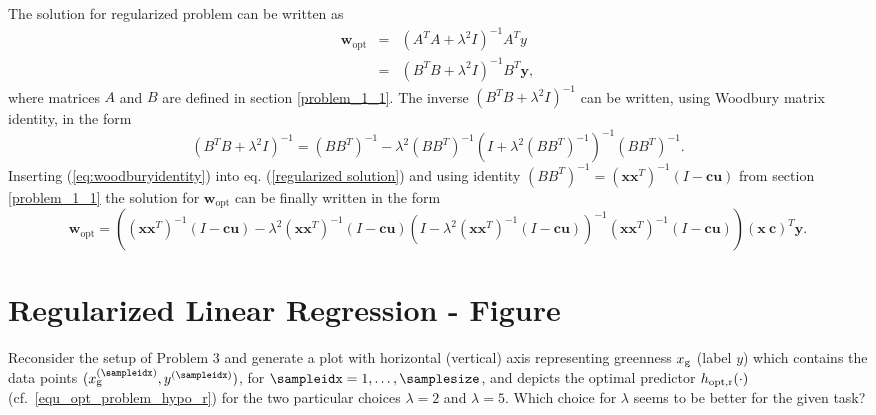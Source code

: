 \documentclass[article,11pt]{article}
\begin{document}
The solution for regularized problem can be written as
\begin{eqnarray}
  \mathbf{w}_\mathrm{opt}&=&(A^TA+\lambda^2I)^{-1}A^Ty\nonumber\\
  &=&(B^TB+\lambda^2I)^{-1}B^T\mathbf{y},
  \label{regularized solution}
\end{eqnarray}
where matrices $A$ and $B$ are defined in section \ref{problem_1_1}. The inverse
$(B^TB+\lambda^2I)^{-1}$ can be written, using Woodbury matrix identity, in the
form
\begin{equation}
  (B^TB+\lambda^2I)^{-1}=(BB^T)^{-1}-\lambda^2(BB^T)^{-1}(I + \lambda^2(BB^T)^{-1})^{-1}(BB^T)^{-1}.
  \label{eq:woodburyidentity}
\end{equation}
Inserting (\ref{eq:woodburyidentity}) into eq. (\ref{regularized solution}) and
using identity $(BB^T)^{-1}=(\mathbf{x}\mathbf{x}^T)^{-1}(I-\mathbf{c}\mathbf{u})$ from section \ref{problem_1_1} the solution for
$\mathbf{w}_\mathrm{opt}$ can be finally written in the form
\begin{equation}
  \mathbf{w}_\mathrm{opt}=\left((\mathbf{x}\mathbf{x}^T)^{-1}(I-\mathbf{c}\mathbf{u})-\lambda^2(\mathbf{x}\mathbf{x}^T)^{-1}(I-\mathbf{c}\mathbf{u})(I-\lambda^2(\mathbf{x}\mathbf{x}^T)^{-1}(I-\mathbf{c}\mathbf{u}))^{-1}(\mathbf{x}\mathbf{x}^T)^{-1}(I-\mathbf{c}\mathbf{u})\right)(\mathbf{x}\:\mathbf{c})^T\mathbf{y}.
\end{equation}
  
  

\newpage
\section{Regularized Linear Regression - Figure}
Reconsider the setup of Problem 3 and generate a plot with horizontal (vertical) axis representing greenness $x_{\rm g}$ (label $y$) 
which contains the data points $(x_{\rm g}^{(\sampleidx)},y^{(\sampleidx)})$, for $\sampleidx=1,\ldots,\samplesize$, and 
depicts the optimal predictor $h_{\rm opt,r}(\cdot)$ (cf.\ \eqref{equ_opt_problem_hypo_r}) for the two particular choices $\lambda=2$ and $\lambda=5$. 
Which choice for $\lambda$ seems to be better for the given task? 
\end{document}
